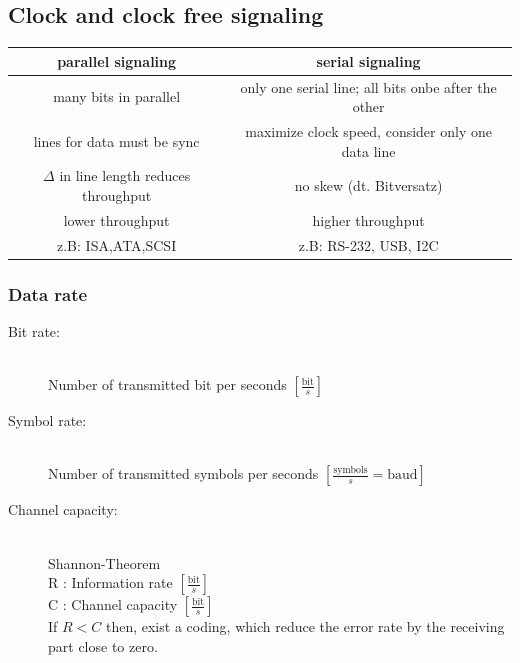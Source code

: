 \subsection{Clock and clock free signaling}
\begin{table}[!h]
	\centering
	\begin{tabular}{|c|c|}
		\hline
		       \textbf{parallel signaling}         &              \textbf{serial signaling}              \\ \hline\hline
		          many bits in parallel            & only one serial line; all bits onbe after the other \\ \hline
		       lines for data must be sync         &  maximize clock speed, consider only one data line  \\ \hline
		$\Delta$ in line length reduces throughput &              no skew (dt. Bitversatz)               \\ \hline
		             lower throughput              &                  higher throughput                  \\ \hline
		            z.B: ISA,ATA,SCSI              &               z.B:  RS-232, USB, I2C                \\ \hline
	\end{tabular}
\end{table}

\subsubsection{Data rate}

\begin{description}
	\item [Bit rate:]\hfill \\
		 Number of transmitted bit per seconds \quad $[\frac{\text{bit}}{s}]$
	\item [Symbol rate:] \hfill \\
		 Number of transmitted symbols per seconds \quad $[\frac{\text{symbols}}{s} = \text{baud}]$
	\item [Channel capacity:] \hfill \\
		 Shannon-Theorem \\
		R : Information rate \quad $[\frac{\text{bit}}{s}]$\\
		C : Channel capacity \quad $[\frac{\text{bit}}{s}]$\\
		If $R<C$ then, exist a coding, which reduce the error rate by the receiving part close to zero.		
\end{description}

